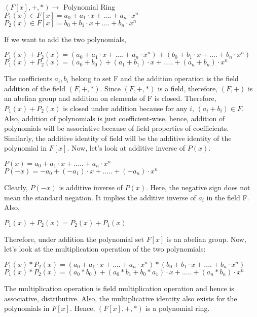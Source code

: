 \documentclass[11pt]{article}
\begin{document}
\begin{center}
    $(F[x], +, *) \rightarrow$ Polynomial Ring\\
    \vspace{1mm}
    $P_1(x) \in F[x] = a_0 + a_1 \cdot x +....+ a_n \cdot x^n$\\
    \vspace{1mm}
    $P_2(x) \in F[x] = b_0 + b_1 \cdot x +....+ b_n \cdot x^n$\\
\end{center}
If we want to add the two polynomials,
\begin{center}
    $P_1(x) + P_2(x) = (a_0 + a_1 \cdot x +....+ a_n \cdot x^n) + (b_0 + b_1 \cdot x +....+ b_n \cdot x^n)$\\
    \vspace{1mm}
    $P_1(x) + P_2(x) = (a_0 + b_0) + (a_1 + b_1) \cdot x +.....+ (a_n + b_n) \cdot x^n$
\end{center}
The coefficients $a_i, b_i$ belong to set F and the addition operation is the field addition of the field $(F, +, *)$. Since $(F, +, *)$ is a field, therefore, $(F, +)$ is an abelian group and addition on elements of F is closed. Therefore, $P_1(x) + P_2(x)$ is closed under addition because for any $i$, $(a_i + b_i) \in F$. Also, addition of polynomials is just coefficient-wise, hence, addition of polynomials will be associative because of field properties of coefficients. Similarly, the additive identity of field will be the additive identity of the polynomial in $F[x]$. Now, let's look at additive inverse of $P(x)$.
\begin{center}
    $P(x) = a_0 + a_1 \cdot x +.....+ a_n \cdot x^n$\\
    $P(-x) = -a_0 + (-a_1) \cdot x +.....+ (-a_n) \cdot x^n$\\
\end{center}
Clearly, $P(-x)$ is additive inverse of $P(x)$. Here, the negative sign does not mean the standard negation. It implies the additive inverse of $a_i$ in the field F. Also, 
\begin{center}
    $P_1(x) + P_2(x) = P_2(x) + P_1(x)$
\end{center}
Therefore, under addition the polynomial set $F[x]$ is an abelian group. Now, let's look at the multiplication operation of the two polynomials:
\begin{center}
    $P_1(x) * P_2(x) = (a_0 + a_1 \cdot x +....+ a_n \cdot x^n) * (b_0 + b_1 \cdot x +....+ b_n \cdot x^n)$\\
    \vspace{1mm}
    $P_1(x) * P_2(x) = (a_0 * b_0) + (a_0 * b_1 + b_0 * a_1) \cdot x +.....+ (a_n * b_n)\cdot x^n$
\end{center}
The multiplication operation is field multiplication operation and hence is associative, distributive. Also, the multiplicative identity also exists for the polynomials in $F[x]$. Hence, $(F[x], +, *)$ is a polynomial ring.
\end{document}
